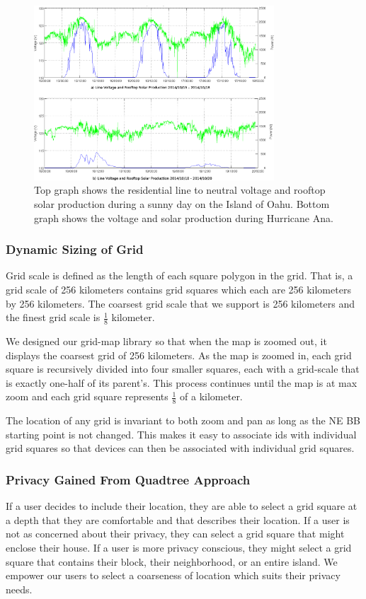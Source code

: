 \begin{figure}[htbp]
	\centering
	\includegraphics[width=0.8\textwidth]{img/weatherTrends.png}
	\caption{Top graph shows the residential line to neutral voltage and rooftop solar production during a sunny day on the Island of Oahu. Bottom graph shows the voltage and solar production during Hurricane Ana.}
	\label{fig:opqbox1}
\end{figure}

\subsubsection{Dynamic Sizing of Grid}
Grid scale is defined as the length of each square polygon in the grid. That is, a grid scale of 256 kilometers contains grid squares which each are 256 kilometers by 256 kilometers. The coarsest grid scale that we support is 256 kilometers and the finest grid scale is $\frac{1}{8}$ kilometer.

We designed our grid-map library so that when the map is zoomed out, it displays the coarsest grid of 256 kilometers. As the map is zoomed in, each grid square is recursively divided into four smaller squares, each with a grid-scale that is exactly one-half of its parent's. This process continues until the map is at max zoom and each grid square represents $\frac{1}{8}$ of a kilometer.

The location of any grid is invariant to both zoom and pan as long as the NE BB starting point is not changed. This makes it easy to associate ids with individual grid squares so that devices can then be associated with individual grid squares.

\subsubsection{Privacy Gained From Quadtree Approach}
If a user decides to include their location, they are able to select a grid square at a depth that they are comfortable and that describes their location. If a user is not as concerned about their privacy, they can select a grid square that might enclose their house. If a user is more privacy conscious, they might select a grid square that contains their block, their neighborhood, or an entire island. We empower our users to select a coarseness of location which suits their privacy needs.





